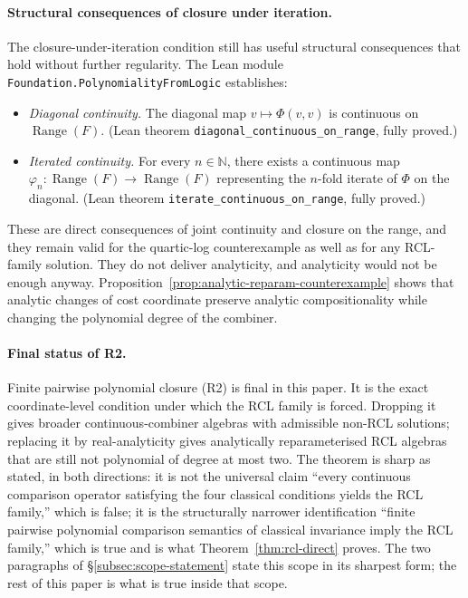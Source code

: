 \documentclass[11pt,a4paper]{article}
\theoremstyle{definition}
\theoremstyle{remark}
\begin{document}
\paragraph{Structural consequences of closure under iteration.} The
closure-under-iteration condition still has useful structural
consequences that hold without further regularity. The Lean module
\texttt{Foundation.PolynomialityFromLogic} establishes:
\begin{itemize}[leftmargin=*]
\item \emph{Diagonal continuity.} The diagonal map
$v \mapsto \Phi(v, v)$ is continuous on $\operatorname{Range}(F)$.
(Lean theorem \texttt{diagonal\_continuous\_on\_range}, fully proved.)
\item \emph{Iterated continuity.} For every $n \in \mathbb{N}$, there
exists a continuous map $\varphi_n :
\operatorname{Range}(F) \to \operatorname{Range}(F)$ representing the
$n$-fold iterate of $\Phi$ on the diagonal. (Lean theorem
\texttt{iterate\_continuous\_on\_range}, fully proved.)
\end{itemize}
These are direct consequences of joint continuity and closure on the
range, and they remain valid for the quartic-log counterexample as
well as for any RCL-family solution. They do not deliver analyticity,
and analyticity would not be enough anyway. Proposition~\ref{prop:analytic-reparam-counterexample}
shows that analytic changes of cost coordinate preserve analytic
compositionality while changing the polynomial degree of the combiner.

\paragraph{Final status of R2.} Finite pairwise polynomial closure
(R2) is final in this paper. It is the exact coordinate-level
condition under which the RCL family is forced. Dropping it gives
broader continuous-combiner algebras with admissible non-RCL
solutions; replacing it by real-analyticity gives analytically
reparameterised RCL algebras that are still not polynomial of degree
at most two. The theorem is sharp as stated, in both directions: it
is not the universal claim ``every continuous comparison operator
satisfying the four classical conditions yields the RCL family,''
which is false; it is the structurally narrower identification
``finite pairwise polynomial comparison semantics of classical
invariance imply the RCL family,'' which is true and is what
Theorem~\ref{thm:rcl-direct} proves. The two paragraphs of
\S\ref{subsec:scope-statement} state this scope in its sharpest
form; the rest of this paper is what is true inside that scope.
\end{document}
